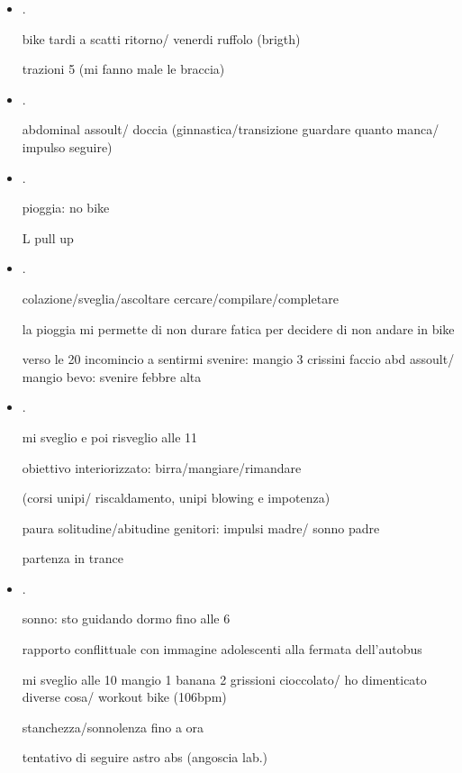 \begin{itemize}
\item {}.

bike tardi a scatti ritorno/ venerdi ruffolo (brigth) 

trazioni 5 (mi fanno male le braccia)

\item {}.

abdominal assoult/ doccia (ginnastica/transizione guardare quanto manca/ impulso seguire)

\item {}.

pioggia: no bike

L pull up


\item {}.

colazione/sveglia/ascoltare cercare/compilare/completare

la pioggia mi permette di non durare fatica per decidere di non andare in bike

verso le 20 incomincio a sentirmi svenire: mangio 3 crissini faccio abd assoult/ mangio bevo: svenire febbre alta 


\item {}.

mi sveglio e poi risveglio alle 11

obiettivo interiorizzato: birra/mangiare/rimandare

 (corsi unipi/ riscaldamento, unipi blowing e impotenza)

paura solitudine/abitudine genitori: impulsi madre/ sonno padre

partenza in trance

\item {}.

sonno: sto guidando  dormo fino alle 6

rapporto conflittuale con immagine adolescenti alla fermata dell'autobus 

mi sveglio alle 10 mangio 1 banana 2 grissioni cioccolato/ ho dimenticato diverse cosa/ workout bike (106bpm)

stanchezza/sonnolenza fino a ora

tentativo di seguire astro abs (angoscia lab.) 


\end{itemize}
